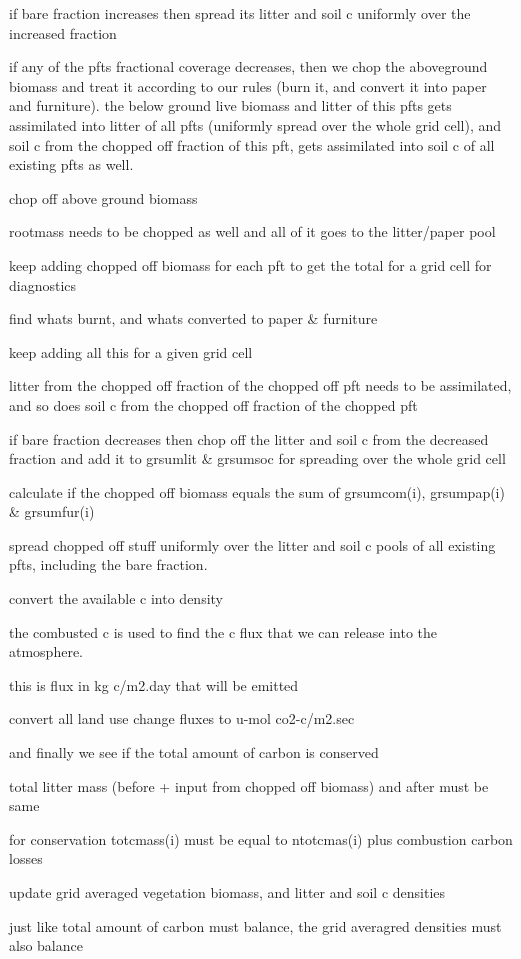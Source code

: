 if bare fraction increases then spread its litter and soil c uniformly over the increased fraction

if any of the pfts fractional coverage decreases, then we chop the aboveground biomass and treat it according to our rules (burn it, and convert it into paper and furniture). the below ground live biomass and litter of this pfts gets assimilated into litter of all pfts (uniformly spread over the whole grid cell), and soil c from the chopped off fraction of this pft, gets assimilated into soil c of all existing pfts as well.

chop off above ground biomass

rootmass needs to be chopped as well and all of it goes to the litter/paper pool

keep adding chopped off biomass for each pft to get the total for a grid cell for diagnostics

find what\textquotesingle{}s burnt, and what\textquotesingle{}s converted to paper \& furniture

keep adding all this for a given grid cell

litter from the chopped off fraction of the chopped off pft needs to be assimilated, and so does soil c from the chopped off fraction of the chopped pft

if bare fraction decreases then chop off the litter and soil c from the decreased fraction and add it to grsumlit \& grsumsoc for spreading over the whole grid cell

calculate if the chopped off biomass equals the sum of grsumcom(i), grsumpap(i) \& grsumfur(i)

spread chopped off stuff uniformly over the litter and soil c pools of all existing pfts, including the bare fraction.

convert the available c into density

the combusted c is used to find the c flux that we can release into the atmosphere.

this is flux in kg c/m2.\+day that will be emitted

convert all land use change fluxes to u-\/mol co2-\/c/m2.\+sec

and finally we see if the total amount of carbon is conserved

total litter mass (before + input from chopped off biomass) and after must be same

for conservation totcmass(i) must be equal to ntotcmas(i) plus combustion carbon losses

update grid averaged vegetation biomass, and litter and soil c densities

just like total amount of carbon must balance, the grid averagred densities must also balance
